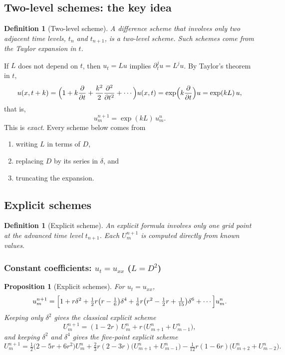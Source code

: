 \documentclass[11pt,a4paper]{article}
\numberwithin{equation}{section}
\theoremstyle{spacedplain}
\newtheorem{proposition}[theorem]{Proposition}
\theoremstyle{spaceddefinition}
\newtheorem{definition}[theorem]{Definition}
\theoremstyle{spacedremark}
\newcommand{\pd}[2]{\frac{\partial #1}{\partial #2}}
\newcommand{\pdd}[2]{\frac{\partial^2 #1}{\partial #2^2}}
\begin{document}
\subsection{Two-level schemes: the key idea}

\begin{definition}[Two-level scheme]
A difference scheme that involves only two adjacent time levels,
\(t_n\) and \(t_{n+1}\), is a \emph{two-level scheme}.  Such schemes
come from the Taylor expansion in \(t\).
\end{definition}

If \(L\) does not depend on \(t\), then \(u_t=Lu\) implies
\(\partial_t^ju=L^ju\).  By Taylor's theorem in \(t\),
\[
  u(x,t+k)
  =\Bigl(1+k\pd{}{t}+\frac{k^2}{2}\pdd{}{t}+\cdots\Bigr)u(x,t)
  =\exp\Bigl(k\pd{}{t}\Bigr)u
  =\exp(kL)\,u,
\]
that is,
\begin{equation}\label{eq:expkl}
  \boxed{u_m^{n+1}=\exp(kL)\,u_m^n}.
\end{equation}
This is \emph{exact}.  Every scheme below comes from
\begin{enumerate}[label=(\alph*)]
  \item writing \(L\) in terms of \(D\),
  \item replacing \(D\) by its series in \(\delta\), and
  \item truncating the expansion.
\end{enumerate}

\subsection{Explicit schemes}

\begin{definition}[Explicit scheme]
An explicit formula involves only \emph{one} grid point at the advanced
time level \(t_{n+1}\).  Each \(U_m^{n+1}\) is computed directly from
known values.
\end{definition}

\subsubsection*{Constant coefficients: \(u_t=u_{xx}\) (\(L=D^2\))}

\begin{proposition}[Explicit schemes]\label{prop:explicit}
For \(u_t=u_{xx}\),
\begin{equation}\label{eq:expseries}
  u_m^{n+1}=\Bigl[1+r\delta^2+\tfrac12r\bigl(r-\tfrac16\bigr)\delta^4
  +\tfrac16r\bigl(r^2-\tfrac12r+\tfrac1{15}\bigr)\delta^6+\cdots\Bigr]u_m^n .
\end{equation}
Keeping only \(\delta^2\) gives the classical explicit scheme
\begin{equation}\label{eq:explicit}
  \boxed{U_m^{n+1}=(1-2r)\,U_m^n+r\,\bigl(U_{m+1}^n+U_{m-1}^n\bigr)},
\end{equation}
and keeping \(\delta^2\) and \(\delta^4\) gives the five-point explicit
scheme
\[
  U_m^{n+1}
  =\tfrac12\bigl(2-5r+6r^2\bigr)U_m^n
   +\tfrac23r(2-3r)\bigl(U_{m+1}^n+U_{m-1}^n\bigr)
   -\tfrac1{12}r(1-6r)\bigl(U_{m+2}^n+U_{m-2}^n\bigr).
\]
\end{proposition}
\end{document}
